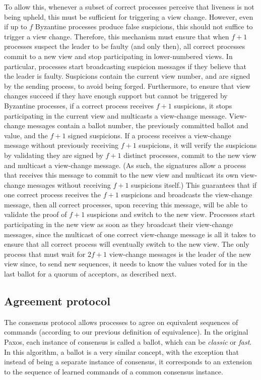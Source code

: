 To allow this, whenever a subset of correct processes perceive that liveness is not being upheld, this must be sufficient for triggering a view change. However, even if up to $f$ Byzantine processes produce false suspicions, this should not suffice to trigger a view change. Therefore, this mechanism must ensure that when $f+1$ processes suspect the leader to be faulty (and only then), all correct processes commit to a new view and stop participating in lower-numbered views. In particular, processes start broadcasting suspicion messages if they believe that the leader is faulty. Suspicions contain the current view number, and are signed by the sending process, to avoid being forged. Furthermore, to ensure that view changes succeed if they have enough support but cannot be triggered by Byzantine processes, if a correct process receives $f+1$ suspicions, it stops participating in the current view and multicasts a view-change message. View-change messages contain a ballot number, the previously committed ballot and value, and the $f+1$ signed suspicions. If a process receives a view-change message without previously receiving $f+1$ suspicions, it will verify the suspicions by validating they are signed by $f+1$ distinct processes, commit to the new view and multicast a view-change message. (As such, the signatures allow a process that receives this message to commit to the new view and multicast its own view-change messages without receiving $f+1$ suspicions itself.)  This guarantees that if one correct process receives the $f+1$ suspicions and broadcasts the view-change message, then all correct processes, upon receving this message, will be able to validate the proof of $f+1$ suspicions and switch to the new view. Processes start participating in the new view as soon as they broadcast their view-change messages, since the multicast of one correct view-change message is all it takes to ensure that all correct process will eventually switch to the new view. The only process that must wait for $2f+1$ view-change messages is the leader of the new view since, to send new sequences, it needs to know the values voted for in the last ballot for a quorum of acceptors, as described next.


\subsection{Agreement protocol} 

The consensus protocol allows processes to agree on equivalent sequences of commands (according to our previous definition of equivalence). In the original Paxos, each instance of consensus is called a ballot, which can be \textit{classic} or \textit{fast}. In this algorithm, a ballot is a very similar concept, with the exception that instead of being a separate instance of consensus, it corresponds to an extension to the sequence of learned commands of a common consensus instance.

